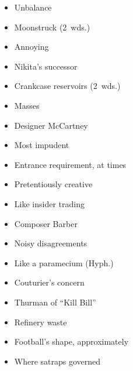 {    \begin{itemize}
      \item
        Unbalance
      \item
        Moonstruck (2~wds.)
    \end{itemize}
  \item
    \begin{itemize}
      \item
        Annoying
      \item
        Nikita's successor
    \end{itemize}
  \item
    \begin{itemize}
      \item
        Crankcase reservoirs (2~wds.)
      \item
        Masses
    \end{itemize}
  \item
    \begin{itemize}
      \item
        Designer McCartney
      \item
        Most impudent
    \end{itemize}
  \item
    \begin{itemize}
      \item
        Entrance requirement, at times
      \item
        Pretentiously creative
    \end{itemize}
  \item
    \begin{itemize}
      \item
        Like insider trading
      \item
        Composer Barber
    \end{itemize}
}{%
  \item
    \begin{itemize}
      \item
        Noisy disagreements
      \item
        Like a paramecium (Hyph.)
      \item
        Couturier's concern
      \item
        Thurman of ``Kill Bill''
      \item
        Refinery waste
      \item
        Football's shape, approximately
      \item
        Where satraps governed
    \end{itemize}
}
